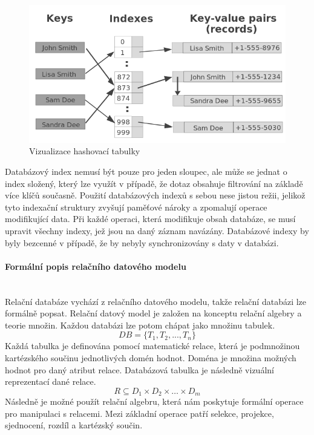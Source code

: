 \begin{figure}[htbp]
    \centering
        \includegraphics[scale=.65]{obrazky-figures/implementation/hash-table.png}
        \caption{Vizualizace hashovací tabulky\protect\footnotemark}
\end{figure}

\noindent
Databázový index nemusí být pouze pro jeden sloupec, ale může se jednat o index složený, který lze využít v případě, že dotaz obsahuje filtrování na základě více klíčů současně.
\newpara
Použití databázových indexů s sebou nese jistou režii, jelikož tyto indexační struktury zvyšují paměťové nároky a zpomalují operace modifikující data. Při každé operaci, která modifikuje obsah databáze, se musí upravit všechny indexy, jež jsou na daný záznam navázány. Databázové indexy by byly bezcenné v případě, že by nebyly synchronizovány s daty v databázi.

\paragraph{Formální popis relačního datového modelu}\mbox{}\\
\noindent Relační databáze vychází z relačního datového modelu, takže relační databázi lze formálně popsat. Relační datový model je založen na konceptu relační algebry a teorie množin. Každou databázi lze potom chápat jako množinu tabulek.
\[DB = \{T_1, T_2, ..., T_n\}\]
Každá tabulka je definována pomocí matematické relace, která je podmnožinou kartézského součinu jednotlivých domén hodnot. Doména je množina možných hodnot pro daný atribut relace. Databázová tabulka je následně vizuální reprezentací dané relace.
\[R \subseteq D_1 \times D_2 \times \ldots \times D_m\]
Následně je možné použít relační algebru, která nám poskytuje formální operace pro manipulaci s relacemi. Mezi základní operace patří selekce, projekce, sjednocení, rozdíl a kartézský součin.



